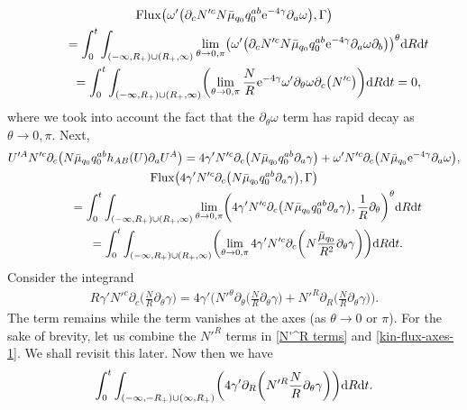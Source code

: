 \documentclass[pdftex]{sigma}
\def\ptl{\partial}%
\numberwithin{equation}{section}
\begin{document}
\begin{gather*}
{\rm Flux} \bigl(\omega' \bigl(\ptl_c N'^c N \bar{\mu}_{q_0} q^{ab} _0 {\rm e}^{-4 \gamma} \ptl_a \omega\bigr), \Gamma\bigr) \notag\\
\qquad{}= \int^t_0 \int_{ (-\infty, R_+) \cup (R_+, \infty) } \lim_{\theta \to 0, \pi} \bigl(\omega' \bigl(\ptl_c N'^c N \bar{\mu}_{q_0} q^{ab} _0 {\rm e}^{-4\gamma} \ptl_a \omega \ptl_b\bigr) \bigr)^\theta {\rm d}R {\rm d}t \notag\\
\qquad{}{}= \int^t_0 \int_{ (-\infty, R_+) \cup (R_+, \infty) } \biggl(\lim_{\theta \to 0, \pi} \frac{N}{R} {\rm e}^{-4\gamma} \omega' \ptl_\theta \omega \ptl_c \bigl(N'^c\bigr) \biggr) {\rm d}R {\rm d}t
=0,
\end{gather*}
where we took into account the fact that the $\ptl_\theta \omega$ term has rapid decay as $\theta \to 0, \pi$.
Next,
\begin{gather*}
U'^A N'^c \ptl_c \bigl(N \bar{\mu}_{q_0} q^{ab}_0 h_{AB} (U) \ptl_a U^A\bigr) = 4\gamma' N'^c\ptl_c \bigl(N \bar{\mu}_{q_0} q^{ab}_0 \ptl_a \gamma\bigr)
+ \omega' N'^c \ptl_c \bigl(N \bar{\mu}_{q_0} {\rm e}^{-4\gamma} \ptl_a \omega\bigr),
\\
{\rm Flux} \bigl(4\gamma' N'^c\ptl_c \bigl(N \bar{\mu}_{q_0} q^{ab}_0 \ptl_a \gamma\bigr), \Gamma\bigr) \notag\\
\qquad{}= \int^t_0 \int_{ (-\infty, R_+) \cup (R_+, \infty) } \lim_{\theta \to 0, \pi} \biggl(
 4\gamma' N'^c\ptl_c \bigl(N \bar{\mu}_{q_0} q^{ab}_0 \ptl_a \gamma\bigr), \frac{1}{R} \ptl_\theta \biggr)^\theta {\rm d}R {\rm d}t \\
\qquad{}= \int^t_0 \int_{ (-\infty, R_+) \cup (R_+, \infty) } \biggl(\lim_{\theta \to 0, \pi} 4 \gamma' N'^c \ptl_c \biggl(N\frac{\bar{\mu}_{q_0}}{R^2} \ptl_\theta \gamma\biggr) \biggr) {\rm d}R {\rm d}t.
\end{gather*}
Consider the integrand
\begin{align} \label{N'^R terms}
 R\gamma' N'^c \ptl_c \biggl(\frac{N}{R} \ptl_\theta \gamma\biggr) = 4 \gamma' \biggl(N'^ \theta \ptl_\theta \biggl(\frac{N}{R} \ptl_\theta \gamma\biggr) + N'^R \ptl_R \biggl(\frac{N}{R} \ptl_\theta \gamma\biggr) \biggr).
\end{align}
The  term remains while the  term vanishes at the axes (as $\theta \to 0$ or $\pi$). For the sake of brevity, let us combine the $N'^R$ terms in \eqref{N'^R terms} and \eqref{kin-flux-axes-1}. We shall revisit this later. Now then we have
\begin{align} \label{kin-flux-comb-nu'}
\int^t_0 \int_{ (-\infty,-R_+) \cup (\infty, R_+)} \biggl(4 \gamma' \ptl_R \biggl(N'^R \frac{N}{R} \ptl_\theta \gamma\biggr) \biggr) {\rm d}R {\rm d}t.
\end{align}
\end{document}
